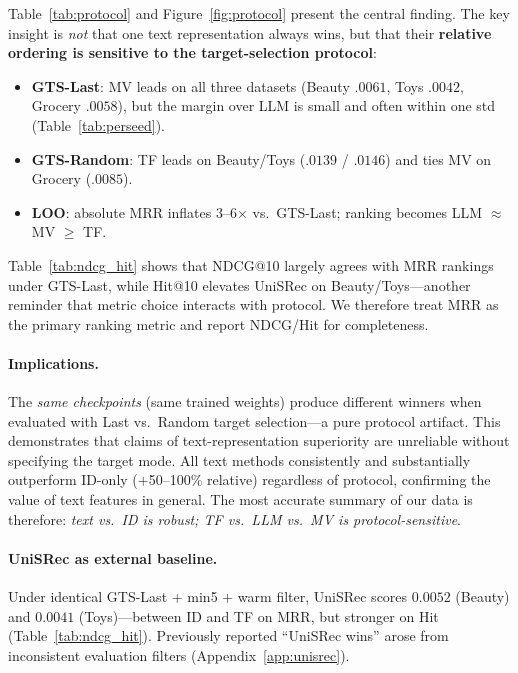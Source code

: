 \documentclass[sigconf,natbib=true,anonymous]{acmart}
\begin{document}
Table~\ref{tab:protocol} and Figure~\ref{fig:protocol} present the central finding.
The key insight is \emph{not} that one text representation always wins, but that their \textbf{relative ordering is sensitive to the target-selection protocol}:

\begin{itemize}[leftmargin=*,itemsep=1pt]
\item \textbf{GTS-Last}: MV leads on all three datasets (Beauty $.0061$, Toys $.0042$, Grocery $.0058$), but the margin over LLM is small and often within one std (Table~\ref{tab:perseed}).
\item \textbf{GTS-Random}: TF leads on Beauty/Toys ($.0139$ / $.0146$) and ties MV on Grocery ($.0085$).
\item \textbf{LOO}: absolute MRR inflates 3--6$\times$ vs.\ GTS-Last; ranking becomes LLM $\approx$ MV $\ge$ TF.
\end{itemize}

Table~\ref{tab:ndcg_hit} shows that NDCG@10 largely agrees with MRR rankings under GTS-Last, while Hit@10 elevates UniSRec on Beauty/Toys---another reminder that metric choice interacts with protocol.
We therefore treat MRR as the primary ranking metric and report NDCG/Hit for completeness.

\paragraph{Implications.}
The \emph{same checkpoints} (same trained weights) produce different winners when evaluated with Last vs.\ Random target selection---a pure protocol artifact.
This demonstrates that claims of text-representation superiority are unreliable without specifying the target mode.
All text methods consistently and substantially outperform ID-only ($+$50--100\% relative) regardless of protocol, confirming the value of text features in general.
The most accurate summary of our data is therefore: \emph{text vs.\ ID is robust; TF vs.\ LLM vs.\ MV is protocol-sensitive}.

\paragraph{UniSRec as external baseline.}
Under identical GTS-Last + min5 + warm filter, UniSRec scores $0.0052$ (Beauty) and $0.0041$ (Toys)---between ID and TF on MRR, but stronger on Hit (Table~\ref{tab:ndcg_hit}).
Previously reported ``UniSRec wins'' arose from inconsistent evaluation filters (Appendix~\ref{app:unisrec}).
\end{document}
